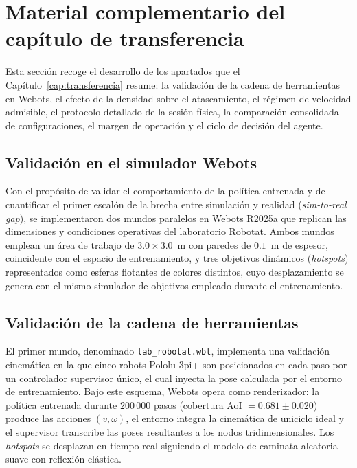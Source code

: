 \section{Material complementario del capítulo de transferencia}
\label{anx:complemento_transferencia}

Esta sección recoge el desarrollo de los apartados que el Capítulo~\ref{cap:transferencia} resume: la validación de la cadena de herramientas en Webots, el
efecto de la densidad sobre el atascamiento, el régimen de velocidad admisible,
el protocolo detallado de la sesión física, la comparación consolidada de
configuraciones, el margen de operación y el ciclo de decisión del agente.

\subsection*{Validación en el simulador Webots}

Con el propósito de validar el comportamiento de la política entrenada y de
cuantificar el primer escalón de la brecha entre simulación y realidad
(\textit{sim-to-real gap}), se implementaron dos mundos paralelos en Webots
R2025a que replican las dimensiones y condiciones operativas del laboratorio
Robotat. Ambos mundos emplean un área de trabajo de $3{.}0 \times 3{.}0$~m con paredes
de $0{.}1$~m de espesor, coincidente con el espacio de entrenamiento, y tres
objetivos dinámicos (\textit{hotspots}) representados como esferas flotantes
de colores distintos, cuyo desplazamiento se genera con el mismo simulador de
objetivos empleado durante el entrenamiento.

\subsection*{Validación de la cadena de herramientas}

El primer mundo, denominado \texttt{lab\_robotat.wbt}, implementa una
validación cinemática en la que cinco robots Pololu 3pi+ son posicionados en
cada paso por un controlador supervisor único, el cual inyecta la
pose calculada por el entorno de entrenamiento. Bajo este esquema, Webots
opera como renderizador: la política entrenada durante $200\,000$ pasos
(cobertura AoI $= 0{.}681 \pm 0{.}020$) produce las acciones $(v, \omega)$, el
entorno integra la cinemática de uniciclo ideal y el supervisor
transcribe las poses resultantes a los nodos tridimensionales. Los
\textit{hotspots} se desplazan en tiempo real siguiendo el modelo de caminata
aleatoria suave con reflexión elástica.

